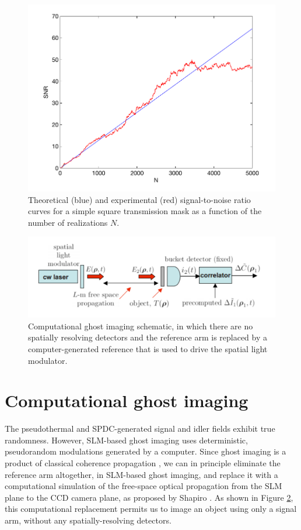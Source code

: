 \begin{figure}[htb]
\centerline{\includegraphics[width=12cm]{figure-ghost-snr.pdf}}
\caption{Theoretical (blue) and experimental (red) signal-to-noise ratio curves for a simple square transmission mask as a function of the number of realizations $N$.}
\label{figure:ghost-snr}
\end{figure}

\begin{figure}[htb]
\centerline{\includegraphics[width=12cm]{figure-ghost-computational-schematic.pdf}}
\caption{Computational ghost imaging schematic, in which there are no spatially resolving detectors and the reference arm is replaced by a computer-generated reference that is used to drive the spatial light modulator.}
\label{figure:ghost-computational-schematic}
\end{figure}

\section{Computational ghost imaging}

The pseudothermal and SPDC-generated signal and idler fields exhibit true randomness. However, SLM-based ghost imaging uses deterministic, pseudorandom modulations generated by a computer. Since ghost imaging is a product of classical coherence propagation \cite{erkmen-unified}, we can in principle eliminate the reference arm altogether, in SLM-based ghost imaging, and replace it with a computational simulation of the free-space optical propagation from the SLM plane to the CCD camera plane, as proposed by Shapiro \cite{shapiro-computational,erkmen-from}. As shown in Figure \ref{figure:ghost-computational-schematic}, this computational replacement permits us to image an object using only a signal arm, without any spatially-resolving detectors.

